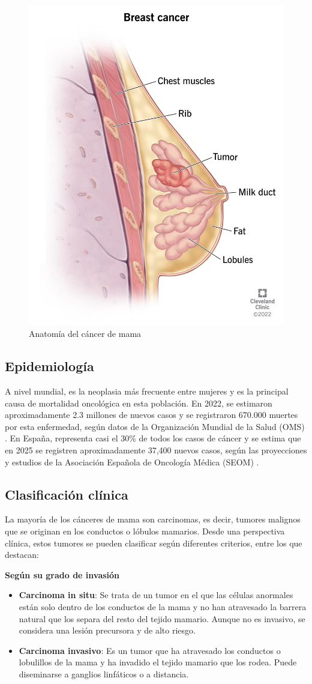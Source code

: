 \documentclass[a4paper,10pt]{book}
\begin{document}
\begin{figure}[h]
    \centering
    \includegraphics[width=0.3\linewidth]{reports//assets/bc.jpg}
    \caption{Anatomía del cáncer de mama \cite{cleveland_clinic_breast_2023}}
    \label{fig:breast-cancer-anatomy}
\end{figure}

\subsection{Epidemiología}

A nivel mundial, es la neoplasia más frecuente entre mujeres y es la principal causa de mortalidad oncológica en esta población. En 2022, se estimaron aproximadamente 2.3 millones de nuevos casos y se registraron 670.000 muertes por esta enfermedad, según datos de la Organización Mundial de la Salud (OMS) \cite{who_breast_2024}. En España, representa casi el 30\% de todos los casos de cáncer y se estima que en 2025 se registren aproximadamente 37,400 nuevos casos, según las proyecciones y estudios de la Asociación Española de Oncología Médica (SEOM) \cite{seom_cancer_nodate}.

\subsection{Clasificación clínica}

La mayoría de los cánceres de mama son carcinomas, es decir, tumores malignos que se originan en los conductos o lóbulos mamarios. Desde una perspectiva clínica, estos tumores se pueden clasificar según diferentes criterios, entre los que destacan:

\textbf{Según su grado de invasión}
\begin{itemize}
    \item \textbf{Carcinoma in situ}: Se trata de un tumor en el que las células anormales están solo dentro de los conductos de la mama y no han atravesado la barrera natural que los separa del resto del tejido mamario. Aunque no es invasivo, se considera una lesión precursora y de alto riesgo.
    \item \textbf{Carcinoma invasivo}: Es un tumor que ha atravesado los conductos o lobulillos de la mama y ha invadido el tejido mamario que los rodea. Puede diseminarse a ganglios linfáticos o a distancia.
\end{itemize}
\end{document}
